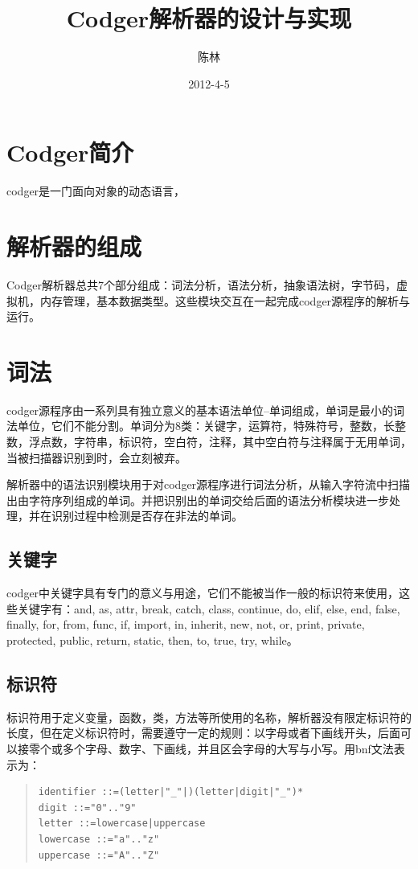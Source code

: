 \documentclass[a4paper,11pt]{article}
\begin{document}
\begin{CJK}{UTF8}{gbsn}
\author{陈林}
\title{Codger解析器的设计与实现}
\date{2012-4-5}
\maketitle
\newpage
\tableofcontents
\newpage
\section{Codger简介}
codger是一门面向对象的动态语言，

\section{解析器的组成}
Codger解析器总共7个部分组成：词法分析，语法分析，抽象语法树，字节码，虚拟机，内存管理，基本数据类型。这些模块交互在一起完成codger源程序的解析与运行。
\section{词法}
codger源程序由一系列具有独立意义的基本语法单位--单词组成，单词是最小的词法单位，它们不能分割。单词分为8类：关键字，运算符，特殊符号，整数，长整数，浮点数，字符串，标识符，空白符，注释，其中空白符与注释属于无用单词，当被扫描器识别到时，会立刻被弃。

解析器中的语法识别模块用于对codger源程序进行词法分析，从输入字符流中扫描出由字符序列组成的单词。并把识别出的单词交给后面的语法分析模块进一步处理，并在识别过程中检测是否存在非法的单词。
\subsection{关键字}
codger中关键字具有专门的意义与用途，它们不能被当作一般的标识符来使用，这些关键字有：and, as, attr, break, catch, class,
continue, do, elif, else, end, false, finally, for, from, func, if, import, in, inherit, new, not, 
or, print, private, protected, public, return, static, then, to, true, try, while。
\subsection{标识符}
标识符用于定义变量，函数，类，方法等所使用的名称，解析器没有限定标识符的长度，但在定义标识符时，需要遵守一定的规则：以字母或者下画线开头，后面可以接零个或多个字母、数字、下画线，并且区会字母的大写与小写。用bnf文法表示为：
\begin{quote}
\begin{verbatim}
identifier ::=(letter|"_"|)(letter|digit|"_")*
digit ::="0".."9"
letter ::=lowercase|uppercase
lowercase ::="a".."z"
uppercase ::="A".."Z"
\end{verbatim}
\end{quote}

\end{CJK}
\end{document}
